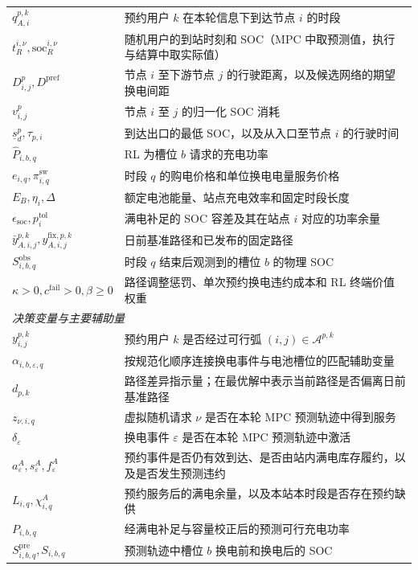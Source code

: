 \documentclass[12pt,a4paper,UTF8]{ctexart}
\begin{document}
\begin{table}[!htbp]
\begin{tabular}{@{}lp{13cm}@{}}
    $q_{A,i}^{p,k}$ & 预约用户 $k$ 在本轮信息下到达节点 $i$ 的时段 \\
    $t_R^{i,\nu},\mathrm{soc}_R^{i,\nu}$ & 随机用户的到站时刻和 SOC（MPC 中取预测值，执行与结算中取实际值） \\
    $D_{i,j}^{p},D^{\mathrm{pref}}$ & 节点 $i$ 至下游节点 $j$ 的行驶距离，以及候选网络的期望换电间距 \\
    $v^{p}_{i,j}$ & 节点 $i$ 至 $j$ 的归一化 SOC 消耗 \\
    $\underline s_d^p,\tau_{p,i}$ & 到达出口的最低 SOC，以及从入口至节点 $i$ 的行驶时间 \\
    $\widehat P_{i,b,q}$ & RL 为槽位 $b$ 请求的充电功率 \\
    $e_{i,q},\pi_{i,q}^{\mathrm{sw}}$ & 时段 $q$ 的购电价格和单位换电电量服务价格 \\
    $E_B,\eta_i,\Delta$ & 额定电池能量、站点充电效率和固定时段长度 \\
    $\epsilon_{\mathrm{soc}},p_i^{\mathrm{tol}}$ & 满电补足的 SOC 容差及其在站点 $i$ 对应的功率余量 \\
    $\bar y_{A,i,j}^{p,k},y_{A,i,j}^{\mathrm{fix},p,k}$ & 日前基准路径和已发布的固定路径 \\
    $S_{i,b,q}^{\mathrm{obs}}$ & 时段 $q$ 结束后观测到的槽位 $b$ 的物理 SOC \\
    $\kappa>0,c^{\mathrm{fail}}>0,\beta\ge0$ & 路径调整惩罚、单次预约换电违约成本和 RL 终端价值权重 \\
    \midrule
    \multicolumn{2}{l}{\textit{决策变量与主要辅助量}} \\
    $y_{i,j}^{p,k}$ & 预约用户 $k$ 是否经过可行弧 $(i,j)\in\mathcal A^{p,k}$ \\
    $\alpha_{i,b,\varepsilon,q}$ & 按规范化顺序连接换电事件与电池槽位的匹配辅助变量 \\
    $d_{p,k}$ & 路径差异指示量；在最优解中表示当前路径是否偏离日前基准路径 \\
    $z_{\nu,i,q}$ & 虚拟随机请求 $\nu$ 是否在本轮 MPC 预测轨迹中得到服务 \\
    $\delta_\varepsilon$ & 换电事件 $\varepsilon$ 是否在本轮 MPC 预测轨迹中激活 \\
    $a_\varepsilon^A,s_\varepsilon^A,f_\varepsilon^A$ & 预约事件是否仍有效到达、是否由站内满电库存履约，以及是否发生预测违约 \\
    $L_{i,q},\chi_{i,q}^A$ & 预约服务后的满电余量，以及本站本时段是否存在预约缺供 \\
    $P_{i,b,q}$ & 经满电补足与容量校正后的预测可行充电功率 \\
    $S_{i,b,q}^{\mathrm{pre}},S_{i,b,q}$ & 预测轨迹中槽位 $b$ 换电前和换电后的 SOC \\
    \bottomrule
  \end{tabular}
\end{table}
\end{document}
